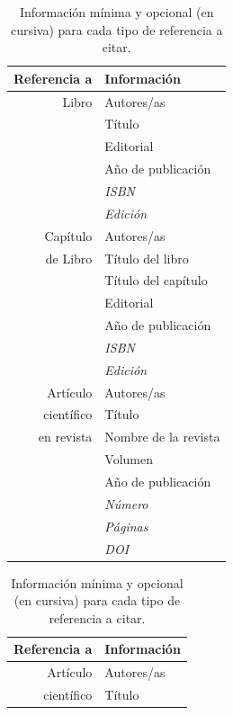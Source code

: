 \begin{table}[!hbt]
    \centering
    \caption{Información mínima y opcional (en cursiva) para cada tipo de referencia a citar.}

    \begin{minipage}{0.48\linewidth}
        \centering    
        \begin{tabular}{r|l}
            \toprule
            Referencia a & Información \\
            \midrule
            Libro & Autores/as \\
            & Título \\
            & Editorial \\
            & Año de publicación \\
            & {\it ISBN} \\
            & {\it Edición} \\
            \midrule
            Capítulo & Autores/as\\
            de Libro & Título del libro\\
            & Título del capítulo\\
            & Editorial\\
            & Año de publicación\\
            & {\it ISBN} \\
            & {\it Edición} \\
            \midrule
            Artículo & Autores/as\\
            científico & Título\\
            en revista & Nombre de la revista\\
            & Volumen \\
            & Año de publicación\\
            & {\it Número} \\  
            & {\it Páginas} \\
            & {\it DOI} \\
            \bottomrule
        \end{tabular}
    \end{minipage}%
    \hfill
    \begin{minipage}{0.48\linewidth}
        \centering
        \begin{tabular}{r|l}
            \toprule
            Referencia a & Información \\
            \midrule
            Artículo & Autores/as\\
            científico & Título\\

\end{tabular}
\end{minipage}
\end{table}
